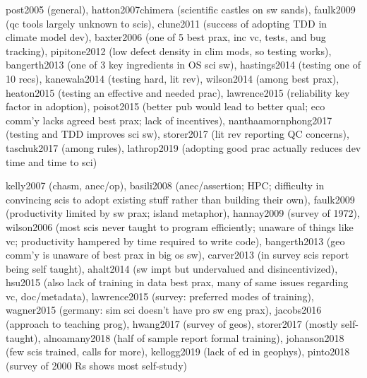 \documentclass[12pt]{amsart}
\begin{document}
post2005 (general), hatton2007chimera (scientific castles on sw sands), faulk2009 (qc tools largely unknown to scis), clune2011 (success of adopting TDD in climate model dev), baxter2006 (one of 5 best prax, inc vc, tests, and bug tracking), pipitone2012 (low defect density in clim mods, so testing works), bangerth2013 (one of 3 key ingredients in OS sci sw), hastings2014 (testing one of 10 recs), kanewala2014 (testing hard, lit rev), wilson2014 (among best prax), heaton2015 (testing an effective and needed prac), lawrence2015 (reliability key factor in adoption), poisot2015 (better pub would lead to better qual; eco comm'y lacks agreed best prax; lack of incentives), nanthaamornphong2017 (testing and TDD improves sci sw), storer2017 (lit rev reporting QC concerns), taschuk2017 (among rules), lathrop2019 (adopting good prac actually reduces dev time and time to sci)

kelly2007 (chasm, anec/op), basili2008 (anec/assertion; HPC; difficulty in convincing scis to adopt existing stuff rather than building their own), faulk2009 (productivity limited by sw prax; island metaphor), hannay2009 (survey of 1972), wilson2006 (most scis never taught to program efficiently; unaware of things like vc; productivity hampered by time required to write code), bangerth2013 (geo comm'y is unaware of best prax in big os sw), carver2013 (in survey scis report being self taught), ahalt2014 (sw impt but undervalued and disincentivized), hsu2015 (also lack of training in data best prax, many of same issues regarding vc, doc/metadata), lawrence2015 (survey: preferred modes of training), wagner2015 (germany: sim sci doesn't have pro sw eng prax), jacobs2016 (approach to teaching prog), hwang2017 (survey of geos), storer2017 (mostly self-taught), alnoamany2018 (half of sample report formal training), johanson2018 (few scis trained, calls for more), kellogg2019 (lack of ed in geophys), pinto2018 (survey of 2000 Rs shows most self-study)
\end{document}
